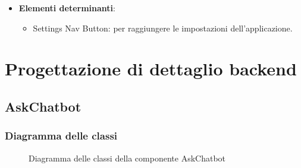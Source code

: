 \documentclass[10pt, a4paper]{article}
\begin{document}
\label{SettingShortcutDettaglio}
\begin{itemize}
    \item \textbf{Elementi determinanti}:
     \begin{itemize}
        \item Settings Nav Button: per raggiungere le impostazioni dell'applicazione.
    \end{itemize}
\end{itemize}


\newpage
   
\section{Progettazione di dettaglio backend}



\subsection{AskChatbot}
\subsubsection{Diagramma delle classi}

\begin{figure}[H]
    \centering        
    \caption{Diagramma delle classi della componente AskChatbot}
\end{figure}
\end{document}
